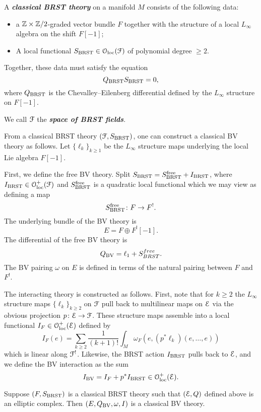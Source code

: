\documentclass[10pt, oneside]{article}
\newcommand{\defterm}[1]{\textbf{\emph{#1}}}
\begin{document}
\begin{definition}
A \defterm{classical BRST theory} on a manifold $M$ consists of the following data:
\begin{itemize}
\item a $\mathbb Z\times\mathbb Z/2$-graded vector bundle $F$ together with the structure of a local $L_\infty$ algebra on the shift $F[-1]$;
\item A local functional $S_{\mathrm{BRST}} \in \mathcal{O}_{\rm loc}(\mathcal F)$ of polynomial degree $\geq 2$.
\end{itemize}
Together, these data must satisfy the equation
\[Q_{\mathrm{BRST}} S_{\mathrm{BRST}} = 0,\]
where $Q_{\mathrm{BRST}}$ is the Chevalley--Eilenberg differential defined by the $L_\infty$ structure on $F[-1]$. 
\end{definition}

We call $\mathcal F$ the \defterm{space of BRST fields}.

From a classical BRST theory $(\mathcal F, S_{\mathrm{BRST}})$, one can construct a classical BV theory as follows. Let $\{\ell_k\}_{k\geq 1}$ be the $L_\infty$ structure maps underlying the local Lie algebra $F[-1]$.

First, we define the free BV theory. Split $S_{\mathrm{BRST}} = S^{\mathrm{free}}_{\mathrm{BRST}} + I_{\mathrm{BRST}}$, where $I_{\mathrm{BRST}}\in\mathcal{O}_{\rm loc}^+(\mathcal F)$ and $S^{\mathrm{free}}_{\mathrm{BRST}}$ is a quadratic local functional which we may view as defining a map
\[S^{\mathrm{free}}_{\mathrm{BRST}}\colon F\rightarrow F^!.\]
The underlying bundle of the BV theory is
\[
E = F \oplus F^! [-1].
\]
The differential of the free BV theory is
\[Q_{\mathrm{BV}} = \ell_1 + S^{free}_{BRST}.
\]
The BV pairing $\omega$ on $E$ is defined in terms of the natural pairing between $F$ and $F^!$.

The interacting theory is constructed as follows. First, note that for $k \geq 2$ the $L_\infty$ structure maps $\{\ell_k\}_{k \geq 2}$ on $\mathcal F$ pull back to multilinear maps on $\mathcal E$ via the obvious projection $p\colon \mathcal E\rightarrow \mathcal F$. These structure maps assemble into a local functional $I_F \in \mathcal{O}_{\rm loc}^+(\mathcal E)$ defined by
\[
I_F (e) = \sum_{k \geq 2} \frac{1}{(k+1)!} \int_M \omega_F(e, (p^*\ell_k) (e, \ldots, e))
\] 
which is linear along $\mathcal F^!$. Likewise, the BRST action $I_{\mathrm{BRST}}$ pulls back to $\mathcal E$, and we define the BV interaction as the sum
\[
I_{\mathrm{BV}} = I_{F} + p^* I_{\mathrm{BRST}} \in \mathcal{O}_{\rm loc}^+(\mathcal E) .
\]

\begin{lemma}
Suppose $(F, S_{\mathrm{BRST}})$ is a classical BRST theory such that $(\mathcal E, Q)$ defined above is an elliptic complex. Then $(E, Q_{\mathrm{BV}}, \omega, I)$ is a classical BV theory.
\end{lemma}
\end{document}
